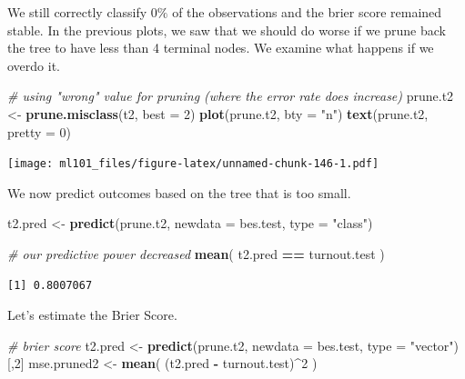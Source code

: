 \documentclass[]{article}
\newenvironment{Shaded}{\begin{snugshade}}{\end{snugshade}}
\newcommand{\CommentTok}[1]{\textcolor[rgb]{0.56,0.35,0.01}{\textit{#1}}}
\newcommand{\DataTypeTok}[1]{\textcolor[rgb]{0.13,0.29,0.53}{#1}}
\newcommand{\DecValTok}[1]{\textcolor[rgb]{0.00,0.00,0.81}{#1}}
\newcommand{\KeywordTok}[1]{\textcolor[rgb]{0.13,0.29,0.53}{\textbf{#1}}}
\newcommand{\NormalTok}[1]{#1}
\newcommand{\OperatorTok}[1]{\textcolor[rgb]{0.81,0.36,0.00}{\textbf{#1}}}
\newcommand{\StringTok}[1]{\textcolor[rgb]{0.31,0.60,0.02}{#1}}
\begin{document}
We still correctly classify 0\(\%\) of the observations and the brier score remained stable. In the previous plots, we saw that we should do worse if we prune back the tree to have less than 4 terminal nodes. We examine what happens if we overdo it.

\begin{Shaded}
\begin{Highlighting}[]
\CommentTok{# using "wrong" value for pruning (where the error rate does increase)}
\NormalTok{prune.t2 <-}\StringTok{ }\KeywordTok{prune.misclass}\NormalTok{(t2, }\DataTypeTok{best =} \DecValTok{2}\NormalTok{)}
\KeywordTok{plot}\NormalTok{(prune.t2, }\DataTypeTok{bty =} \StringTok{"n"}\NormalTok{)}
\KeywordTok{text}\NormalTok{(prune.t2, }\DataTypeTok{pretty =} \DecValTok{0}\NormalTok{)}
\end{Highlighting}
\end{Shaded}

\texttt{[image: ml101\_files/figure-latex/unnamed-chunk-146-1.pdf]}

We now predict outcomes based on the tree that is too small.

\begin{Shaded}
\begin{Highlighting}[]
\NormalTok{t2.pred <-}\StringTok{ }\KeywordTok{predict}\NormalTok{(prune.t2, }\DataTypeTok{newdata =}\NormalTok{ bes.test, }\DataTypeTok{type =} \StringTok{"class"}\NormalTok{)}

\CommentTok{# our predictive power decreased}
\KeywordTok{mean}\NormalTok{( t2.pred }\OperatorTok{==}\StringTok{ }\NormalTok{turnout.test )}
\end{Highlighting}
\end{Shaded}

\begin{verbatim}
[1] 0.8007067
\end{verbatim}

Let's estimate the Brier Score.

\begin{Shaded}
\begin{Highlighting}[]
\CommentTok{# brier score}
\NormalTok{t2.pred <-}\StringTok{ }\KeywordTok{predict}\NormalTok{(prune.t2, }\DataTypeTok{newdata =}\NormalTok{ bes.test, }\DataTypeTok{type =} \StringTok{"vector"}\NormalTok{)[,}\DecValTok{2}\NormalTok{]}
\NormalTok{mse.pruned2 <-}\StringTok{ }\KeywordTok{mean}\NormalTok{( (t2.pred }\OperatorTok{-}\StringTok{ }\NormalTok{turnout.test)}\OperatorTok{^}\DecValTok{2}\NormalTok{ ) }
\end{Highlighting}
\end{Shaded}
\end{document}
